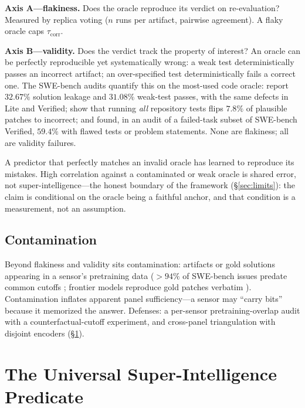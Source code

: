 \documentclass[10pt,twocolumn]{article}
\begin{document}
\textbf{Axis A---flakiness.} Does the oracle reproduce its verdict on
re-evaluation? Measured by replica voting ($n$ runs per artifact, pairwise
agreement). A flaky oracle caps $\tau_{\mathrm{corr}}$.

\textbf{Axis B---validity.} Does the verdict track the property of interest? An
oracle can be perfectly reproducible yet systematically wrong: a weak test
deterministically passes an incorrect artifact; an over-specified test
deterministically fails a correct one. The SWE-bench audits quantify this on the
most-used code oracle: \citet{aleithan2024swebenchplus} report $32.67\%$ solution
leakage and $31.08\%$ weak-test passes, with the same defects in Lite and
Verified; \citet{wang2025solved} show that running \emph{all} repository tests
flips $7.8\%$ of plausible patches to incorrect; and \citet{openai2026swebench}
found, in an audit of a failed-task subset of SWE-bench Verified, $59.4\%$ with
flawed tests or problem statements. None are flakiness; all are validity failures.

A predictor that perfectly matches an invalid oracle has learned to reproduce its
mistakes. High correlation against a contaminated or weak oracle is shared error,
not super-intelligence---the honest boundary of the framework
(\S\ref{sec:limits}): the claim is conditional on the oracle being a faithful
anchor, and that condition is a measurement, not an assumption.

\subsection{Contamination}
Beyond flakiness and validity sits contamination: artifacts or gold solutions
appearing in a sensor's pretraining data ($>94\%$ of SWE-bench issues predate
common cutoffs \citep{aleithan2024swebenchplus}; frontier models reproduce gold
patches verbatim \citep{openai2026swebench}). Contamination inflates apparent
panel sufficiency---a sensor may ``carry bits'' because it memorized the answer.
Defenses: a per-sensor pretraining-overlap audit with a counterfactual-cutoff
experiment, and cross-panel triangulation with disjoint encoders
(\S\ref{sec:predicate}).

\section{The Universal Super-Intelligence Predicate}
\label{sec:predicate}
\end{document}
